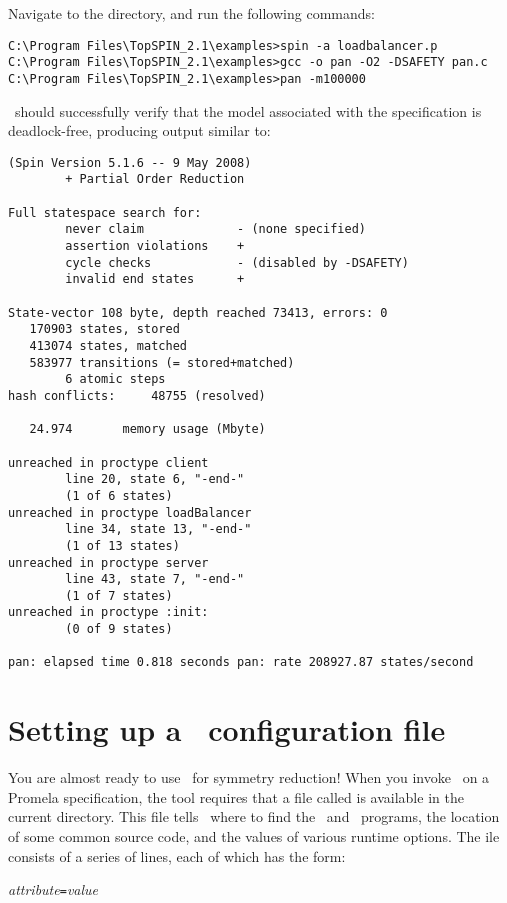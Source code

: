 Navigate to the  directory, and run the following
commands:
%
\begin{lstlisting}
C:\Program Files\TopSPIN_2.1\examples>spin -a loadbalancer.p
C:\Program Files\TopSPIN_2.1\examples>gcc -o pan -O2 -DSAFETY pan.c
C:\Program Files\TopSPIN_2.1\examples>pan -m100000
\end{lstlisting}
%
\spin\ should successfully verify that the model associated with the
specification is deadlock-free, producing output similar to:
%
\begin{lstlisting}
(Spin Version 5.1.6 -- 9 May 2008)
        + Partial Order Reduction

Full statespace search for:
        never claim             - (none specified)
        assertion violations    +
        cycle checks            - (disabled by -DSAFETY)
        invalid end states      +

State-vector 108 byte, depth reached 73413, errors: 0
   170903 states, stored
   413074 states, matched
   583977 transitions (= stored+matched)
        6 atomic steps
hash conflicts:     48755 (resolved)

   24.974       memory usage (Mbyte)

unreached in proctype client
        line 20, state 6, "-end-"
        (1 of 6 states)
unreached in proctype loadBalancer
        line 34, state 13, "-end-"
        (1 of 13 states)
unreached in proctype server
        line 43, state 7, "-end-"
        (1 of 7 states)
unreached in proctype :init:
        (0 of 9 states)

pan: elapsed time 0.818 seconds pan: rate 208927.87 states/second
\end{lstlisting}

\section{Setting up a \protect\topspin\ configuration file}\label{sec:example:configuration}

You are almost ready to use \topspin\ for symmetry reduction!  When
you invoke \topspin\ on a Promela specification, the tool requires
that a file called  is available in the current
directory.  This file tells \topspin\ where to find the \gap\ and
\saucy\ programs, the location of some common source code, and the
values of various runtime options. The ile consists of a series of
lines, each of which has the form:

\vspace{2mm} \emph{attribute}\texttt{=}\emph{value} \vspace{2mm}

